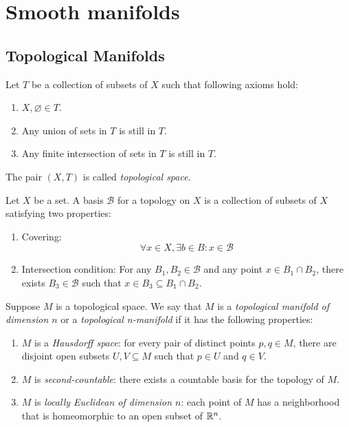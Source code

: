 \chapter{Smooth manifolds}
\section{Topological Manifolds}
\begin{definition}
    Let $T$ be a collection of subsets of $X$ such that following axioms hold:
    \begin{enumerate}
        \item $X, \varnothing \in T$.
        \item Any union of sets in $T$ is still in $T$.
        \item Any finite intersection of sets in $T$ is still in $T$.
    \end{enumerate}
    The pair $(X,T)$ is called \textit{topological space}.
\end{definition}
\begin{definition}
    Let $X$ be a set. A basis $\mathcal{B}$ for a topology on $X$ is a collection of subsets of $X$ satisfying two properties:
    \begin{enumerate}
        \item Covering:
        \[
        \forall x \in X, \exists b \in B: x \in \mathcal{B}
        \]
        \item Intersection condition: For any $B_1,B_2 \in \mathcal{B}$ and any point $x \in B_1 \cap B_2$, there exists $B_3 \in \mathcal{B}$ such that $x \in B_3 \subseteq B_1 \cap B_2$.
    \end{enumerate}
\end{definition}
\begin{definition}
    Suppose $M$ is a topological space. We say that $M$ is a \textit{topological manifold of dimension $n$} or a \textit{topological n-manifold} if it has the following properties:
    \begin{enumerate}
        \item $M$ is a \textit{Hausdorff space}: for every pair of distinct points $p,q \in M$, there are disjoint open subsets $U,V \subseteq M$ such that $p \in U$ and $q \in V$.
        \item $M$ is \textit{second-countable}: there exists a countable basis for the topology of $M$.
        \item $M$ is \textit{locally Euclidean of dimension $n$}: each point of $M$ has a neighborhood that is homeomorphic to an open subset of $\mathbb{R}^n$.
    \end{enumerate}
\end{definition}
